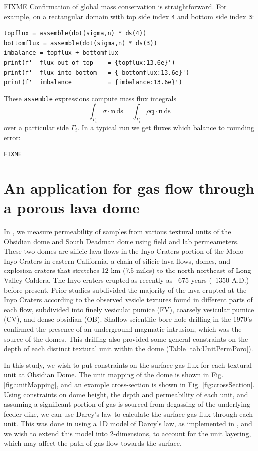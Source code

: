 \documentclass[11pt]{amsart}
\newcommand{\bn}{\mathbf{n}}
\newcommand{\bq}{\mathbf{q}}
\newcommand{\ds}{\mathrm{ds}}
\begin{document}
FIXME Confirmation of global mass conservation is straightforward.  For example, on a rectangular domain with top side index \verb|4| and bottom side index \verb|3|:
\begin{Verbatim}[fontsize=\small,frame=lines]
topflux = assemble(dot(sigma,n) * ds(4))
bottomflux = assemble(dot(sigma,n) * ds(3))
imbalance = topflux + bottomflux
print(f'  flux out of top    = {topflux:13.6e}')
print(f'  flux into bottom   = {-bottomflux:13.6e}')
print(f'  imbalance          = {imbalance:13.6e}')
\end{Verbatim}
These \verb|assemble| expressions compute mass flux integrals
    $$\int_{\Gamma_i} \sigma\cdot \bn\,\ds = \int_{\Gamma_i} \rho \bq\cdot \bn\,\ds$$
over a particular side $\Gamma_i$.  In a typical run we get fluxes which balance to rounding error:
\begin{Verbatim}[fontsize=\small,frame=leftline]
FIXME
\end{Verbatim}


\section{An application for gas flow through a porous lava dome}

In \cite{Graham2023}, we measure permeability of samples from various textural units of the Obsidian dome and South Deadman dome using field and lab permeameters. These two domes are silicic lava flows in the Inyo Craters portion of the Mono-Inyo Craters in eastern California, a chain of silicic lava flows, domes, and explosion craters that stretches 12 km (7.5 miles) to the north-northeast of Long Valley Caldera. The Inyo craters erupted as recently as ~675 years (~1350 A.D.) before present. Prior studies subdivided the majority of the lava erupted at the Inyo Craters according to the observed vesicle textures found in different parts of each flow, subdivided into finely vesicular pumice (FV), coarsely vesicular pumice (CV), and dense obsidian (OB). Shallow scientific bore hole drilling in the 1970's confirmed the presence of an underground magmatic intrusion, which was the source of the domes. This drilling also provided some general constraints on the depth of each distinct textural unit within the dome (Table \ref{tab:UnitPermPoro}).

In this study, we wish to put constraints on the surface gas flux for each textural unit at Obsidian Dome. The unit mapping of the dome is shown in Fig. \ref{fig:unitMapping}, and an example cross-section is shown in Fig. \ref{fig:crossSection}. Using constraints on dome height, the depth and permeability of each unit, and assuming a significant portion of gas is sourced from degassing of the underlying feeder dike, we can use Darcy's law to calculate the surface gas flux through each unit. This was done in \cite{Graham2023} using a 1D model of Darcy's law, as implemented in \cite{Edmonds2003}, and we wish to extend this model into 2-dimensions, to account for the unit layering, which may affect the path of gas flow towards the surface.
\end{document}
